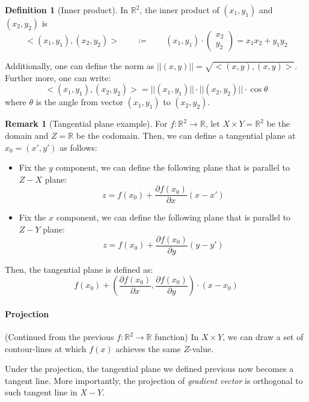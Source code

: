 \documentclass[12pt]{article}
\newcommand{\R}{{\mathbb R}}
\theoremstyle{definition}
\newtheorem{definition}[theorem]{Definition}
\newtheorem{remark}[theorem]{Remark}
\theoremstyle{plain}
\begin{document}
\begin{definition}
    [Inner product]
    In $\R^2$, the inner product of $(x_1, y_1)$ and $(x_2, y_2)$ is
    \[
        <(x_1, y_1), (x_2, y_2)> \qquad \coloneqq \qquad
        (x_1, y_1)
        \cdot
        \begin{pmatrix}
            x_2 \\ y_2
        \end{pmatrix}
        = x_1 x_2 + y_1 y_2
    \]

    Additionally, one can define the norm as $||(x,y)|| = \sqrt{<(x,y),
    (x,y)>}$. Further more, one can write:
    \[
        <(x_1, y_1), (x_2, y_2)> = ||(x_1, y_1)|| \cdot ||(x_2, y_2)|| \cdot
        \cos \theta
    \]
    where $\theta$ is the angle from vector $(x_1, y_1)$ to $(x_2, y_2)$.
\end{definition}

\begin{remark}
    [Tangential plane example]
    \label{remark:tangential_in_R_2}
    For $f: \R^2 \to \R$,  let $X\times Y = \R^2$ be the domain and $Z = \R$ be
    the codomain. Then, we can define a tangential plane at $x_0 = (x',y')$ as follows:
    \begin{itemize}
        \item Fix the $y$ component, we can define the following plane that is
            parallel to $Z-X$ plane:
            \[
                z = f(x_0) + \frac{\partial f(x_0)}{ \partial x} (x - x')
            \]
        \item Fix the $x$ component, we can define the following plane that is
            parallel to $Z-Y$ plane:
            \[
                z = f(x_0) + \frac{\partial f(x_0)}{ \partial y} (y - y')
            \]
    \end{itemize}
    Then, the tangential plane is defined as:
    \[
        f(x_0) + \left( \frac{\partial f(x_0)}{\partial x},
        \frac{\partial f(x_0)}{\partial y} \right)\cdot(x - x_0)
    \]
\end{remark}

\paragraph{Projection}
(Continued from the previous $f:\R^2 \to \R$ function) In $X\times Y$, we can
draw a set of contour-lines at which $f(x)$ achieves the same $Z$-value.

Under the projection, the tangential plane we defined previous now becomes a
tangent line. More importantly, the projection of \textit{gradient vector} is
orthogonal to such tangent line in $X-Y$.
\end{document}
